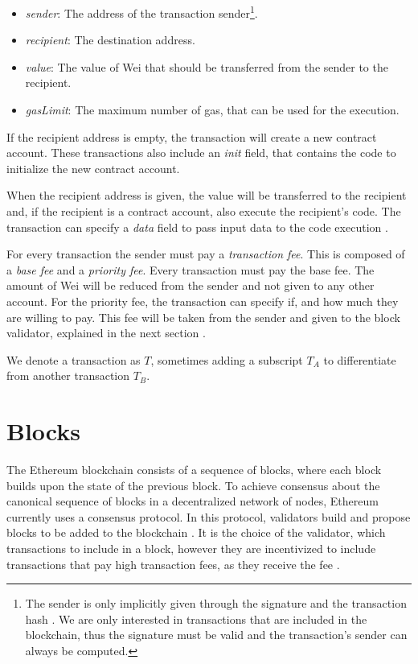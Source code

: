 \documentclass[draft,final]{vutinfth} %
\begin{document}
\begin{itemize}
    \item \emph{sender}: The address of the transaction sender\footnote{The sender is only implicitly given through the signature and the transaction hash \cite[p.25-27]{wood_ethereum_2024}. We are only interested in transactions that are included in the blockchain, thus the signature must be valid and the transaction's sender can always be computed.}.
    \item \emph{recipient}: The destination address.
    \item \emph{value}: The value of Wei that should be transferred from the sender to the recipient.
    \item \emph{gasLimit}: The maximum number of gas, that can be used for the execution.
\end{itemize}

If the recipient address is empty, the transaction will create a new contract account. These transactions also include an \emph{init} field, that contains the code to initialize the new contract account.

When the recipient address is given, the value will be transferred to the recipient and, if the recipient is a contract account, also execute the recipient's code. The transaction can specify a \emph{data} field to pass input data to the code execution \cite[p.4-5]{wood_ethereum_2024}.


For every transaction the sender must pay a \emph{transaction fee}. This is composed of a \emph{base fee} and a \emph{priority fee}. Every transaction must pay the base fee. The amount of Wei will be reduced from the sender and not given to any other account. For the priority fee, the transaction can specify if, and how much they are willing to pay. This fee will be taken from the sender and given to the block validator, explained in the next section \cite[p.8]{wood_ethereum_2024}.

We denote a transaction as $T$, sometimes adding a subscript $T_A$ to differentiate from another transaction $T_B$.


\section{Blocks}

The Ethereum blockchain consists of a sequence of blocks, where each block builds upon the state of the previous block. To achieve consensus about the canonical sequence of blocks in a decentralized network of nodes, Ethereum currently uses a consensus protocol. In this protocol, validators build and propose blocks to be added to the blockchain \cite{noauthor_gasper_2024}. It is the choice of the validator, which transactions to include in a block, however they are incentivized to include transactions that pay high transaction fees, as they receive the fee \cite[p.8]{wood_ethereum_2024}.
\end{document}
